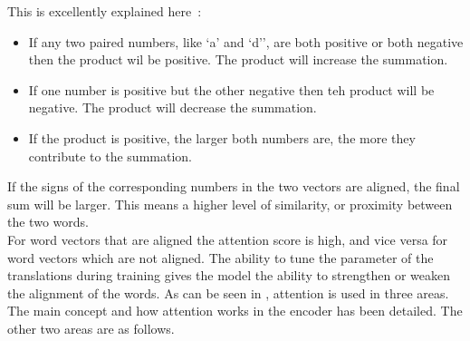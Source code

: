 This is excellently explained here~\autocite{doshiTransformersExplainedVisually2021b}:
\begin{itemize}
	\item If any two paired numbers, like `a' and `d'', are both positive or both negative then the product wil be positive. The product will
	      increase the summation.
	\item If one number is positive but the other negative then teh product will be negative. The product will decrease the summation.
	\item If the product is positive, the larger both numbers are, the more they contribute to the summation.
\end{itemize}
If the signs of the corresponding numbers in the two vectors are aligned, the final sum will be larger. This means a higher level of similarity,
or proximity between the two words.\\
For word vectors that are aligned the attention score is high, and vice versa for word vectors which are not aligned.
The ability to tune the parameter of the translations during training gives the model the ability to strengthen or weaken the alignment of the
words.
\bigbreak
As can be seen in , attention is used in three areas. The main concept and how attention works in the encoder has
been detailed. The other two areas are as follows.